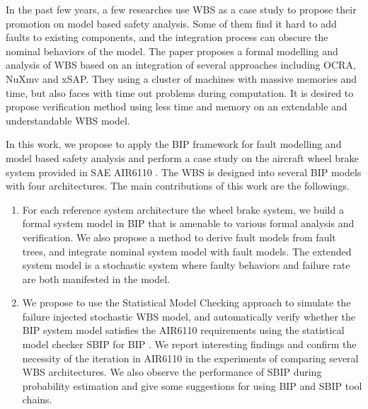 
In the past few years, a few researches use WBS as a case study to propose their promotion on model based safety analysis.
 Some of them find it hard to add faults to existing components, and the integration process can obscure the nominal behaviors of the model. 
 The paper\cite{cav15} proposes a formal modelling and analysis of WBS based on an integration of several approaches including OCRA, NuXmv and xSAP.
 They using a cluster of machines with massive memories and time, but also faces with time out problems during computation. 
 It is desired to propose verification method using less time and memory on an extendable and understandable WBS model.

In this work, we propose to apply the BIP framework for fault modelling and model based safety analysis 
 and perform a case study on the aircraft wheel brake system provided in SAE AIR6110  \cite{air6110}.
 The WBS is designed into several BIP models with four architectures. 
 The main contributions of this work are the followings.

\begin{enumerate}
\item For each reference system architecture the wheel brake system, we build a formal system model in BIP that is amenable to various formal analysis and verification.
 We also propose a method to derive fault models from fault trees, and integrate nominal system model with fault models. 
 The extended system model is a stochastic system where faulty behaviors and failure rate are both manifested in the model.

\item We propose to use the Statistical Model Checking\cite{vmcai04,cav04,cmu04} approach to simulate the failure injected stochastic WBS model,
 and automatically verify whether the BIP system model satisfies the AIR6110 requirements using the statistical model checker SBIP for BIP \cite{sbip18}.
 We report interesting findings and confirm the necessity of the iteration in AIR6110 in the experiments of comparing several WBS architectures. 
 We also observe the performance of SBIP during probability estimation and give some suggestions for using BIP and SBIP tool chains.
\end{enumerate}

